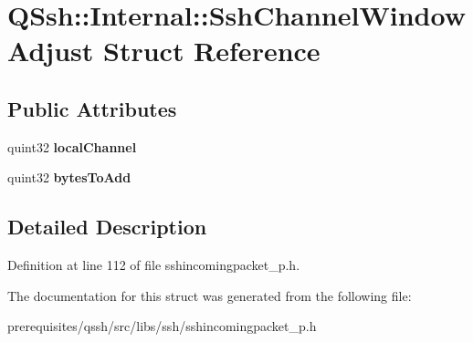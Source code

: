 \hypertarget{struct_q_ssh_1_1_internal_1_1_ssh_channel_window_adjust}{}\section{Q\+Ssh\+:\+:Internal\+:\+:Ssh\+Channel\+Window\+Adjust Struct Reference}
\label{struct_q_ssh_1_1_internal_1_1_ssh_channel_window_adjust}
\subsection*{Public Attributes}
\begin{DoxyCompactItemize}
\item 
\mbox{\label{struct_q_ssh_1_1_internal_1_1_ssh_channel_window_adjust_a6604f860fb267825b1abb0810beb894a}} 
quint32 {\bfseries local\+Channel}
\item 
\mbox{\label{struct_q_ssh_1_1_internal_1_1_ssh_channel_window_adjust_a50dbbab0afe54f56475ba41b6471a446}} 
quint32 {\bfseries bytes\+To\+Add}
\end{DoxyCompactItemize}


\subsection{Detailed Description}


Definition at line 112 of file sshincomingpacket\+\_\+p.\+h.



The documentation for this struct was generated from the following file\+:\begin{DoxyCompactItemize}
\item 
prerequisites/qssh/src/libs/ssh/sshincomingpacket\+\_\+p.\+h\end{DoxyCompactItemize}
